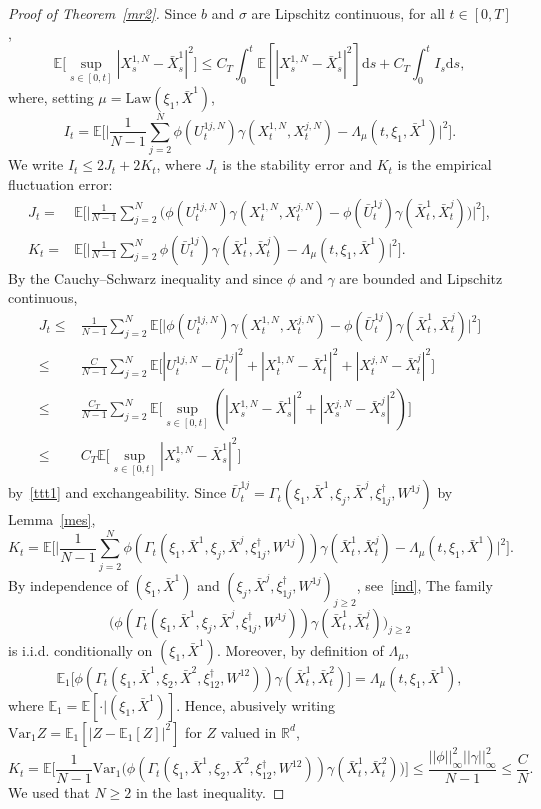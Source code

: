 \documentclass{amsart}
\newcommand{\rr}{{\mathbb{R}}}
\newcommand{\E}{\mathbb{E}}
\newcommand{\bX}{\bar X}
\newcommand{\bU}{\bar U}
\newcommand{\vmark}{\xi}
\newcommand{\emark}{\vmark^\dagger}
\newcommand{\dd}{{\mathrm{d}}}
\begin{document}
\begin{proof}[Proof of Theorem~\ref{mr2}]
Since $b$ and $\sigma$ are Lipschitz continuous,
for all $t\in [0,T]$,
\begin{equation}\label{encun}
\E\Big[\sup_{s\in [0,t]}|X^{1,N}_s-\bX^1_s|^2\Big]\leq C_T \int_0^t\E[|X^{1,N}_s-\bX^1_s|^2] \dd s
+ C_T\int_0^t I_s \dd s,
\end{equation}
where, setting  $\mu=\mathrm{Law}(\vmark_1,\bX^1)$,
$$
I_t= \E\Big[\Big|\frac1{N-1}\sum_{j=2}^N \phi(U^{1j,N}_t)\gamma(X^{1,N}_t,X^{j,N}_t)
- \Lambda_\mu(t,\vmark_1,\bX^1)\Big|^2\Big].
$$
We write $I_t\leq 2J_t+2K_t$, where $J_t$ is the stability error and $K_t$ is
the empirical fluctuation error:
\begin{align*}
J_t=& \E\Big[\Big|\frac1{N-1}\sum_{j=2}^N \Big(\phi(U^{1j,N}_t)\gamma(X^{1,N}_t,X^{j,N}_t)
-\phi(\bU^{1j}_t)\gamma(\bX^1_t,\bX^j_t)\Big)\Big|^2\Big],\\
K_t=& \E\Big[\Big|\frac1{N-1}\sum_{j=2}^N\phi(\bU^{1j}_t)\gamma(\bX^1_t,\bX^j_t)
- \Lambda_\mu(t,\vmark_1,\bX^1)\Big|^2\Big].
\end{align*}
By the Cauchy--Schwarz inequality and since $\phi$ and $\gamma$ are bounded and Lipschitz continuous,
\begin{align*}
J_t\leq& \frac1{N-1}\sum_{j=2}^N\E\Big[\Big|\phi(U^{1j,N}_t)\gamma(X^{1,N}_t,X^{j,N}_t)
-\phi(\bU^{1j}_t)\gamma(\bX^1_t,\bX^j_t)\Big|^2\Big] \\
\leq&  \frac C{N-1}\sum_{j=2}^N\E\Big[ |U^{1j,N}_t-\bU^{1j}_t|^2+ |X^{1,N}_t-\bX^1_t|^2+|X^{j,N}_t-\bX^j_t|^2\Big]\\
\leq & \frac {C_T}{N-1}\sum_{j=2}^N\E\Big[\sup_{s\in [0,t]}(|X^{1,N}_s-\bX^{1}_s|^2+|X^{j,N}_s-{\bX^j_s}|^2)\Big]\\
\leq &C_T \E\Big[\sup_{s\in [0,t]} |X^{1,N}_s-\bX^{1}_s|^2\Big]
\end{align*}
by~\eqref{ttt1} and exchangeability.
Since $\bU^{1j}_t=\Gamma_t(\vmark_1,\bX^1,\vmark_j,\bX^j,\emark_{1j},W^{1j})$ by Lemma~\ref{mes},
$$
K_t=\E\Big[\Big|\frac1{N-1}\sum_{j=2}^N \phi(\Gamma_t(\vmark_1,\bX^1,\vmark_j,\bX^j,\emark_{1j},W^{1j}))\gamma(\bX^1_t,\bX^j_t)
- \Lambda_\mu(t,\vmark_1,\bX^1)\Big|^2\Big].
$$
By independence of $(\vmark_1,\bX^1)$ and
$(\vmark_j,\bX^j,\emark_{1j},W^{1j})_{j\geq 2}$, see~\eqref{ind}, 
The family 
$$
\big(\phi(\Gamma_t(\vmark_1,\bX^1,\vmark_j,\bX^j,\emark_{1j},W^{1j}))
\gamma(\bX^1_t,\bX^j_t)\big)_{j\geq2}
$$ 
is i.i.d. conditionally on $(\vmark_1,\bX^1)$. Moreover, by definition of $\Lambda_\mu$,
$$
\E_1\Big[
\phi(\Gamma_t(\vmark_1,\bX^1,\vmark_2,\bX^2,\emark_{12},W^{12}))
\gamma(\bX^1_t,\bX^2_t)\Big]=\Lambda_\mu(t,\vmark_1,\bX^1),
$$
where $\E_1= \E[\cdot | (\vmark_1,\bX^1)]$. Hence, abusively writing $\mathrm{Var}_{1} Z=
\E_{1}[|Z-\E_{1}[Z]|^2]$ for $Z$ valued in $\rr^d$,
$$
K_t= \E\Big[\frac 1{N-1} \mathrm{Var}_{1} \Big(
\phi(\Gamma_t(\vmark_1,\bX^1,\vmark_2,\bX^2,\emark_{12},W^{12}))
\gamma(\bX^1_t,\bX^2_t)\Big)\Big]
\leq \frac{||\phi||_\infty^2||\gamma||_\infty^2}{N-1}\leq \frac C N.
$$
We used that $N\geq 2$ in the last inequality.


\end{proof}
\end{document}
